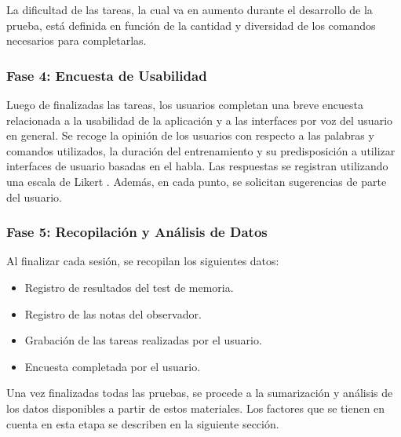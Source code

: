 La dificultad de las tareas, la cual va en aumento durante el desarrollo de la prueba, est\'a definida en funci\'on
de la cantidad y diversidad de los comandos necesarios para completarlas.

\subsubsection{Fase 4: Encuesta de Usabilidad}
Luego de finalizadas las tareas, los usuarios completan una breve encuesta relacionada a la usabilidad de
la aplicaci\'on y a las interfaces por voz del usuario en general.
Se recoge la opini\'on de los usuarios con respecto a las palabras y comandos utilizados, la duraci\'on del
entrenamiento y su predisposici\'on a utilizar interfaces de usuario basadas en el habla. Las respuestas se
registran utilizando una escala de Likert \cite{Allen:2007}.
Adem\'as, en cada punto, se solicitan sugerencias de parte del usuario. 	

\subsubsection{Fase 5: Recopilaci\'on y An\'alisis de Datos} 
Al finalizar cada sesi\'on, se recopilan los siguientes datos:
	\begin{itemize}			
		\item Registro de resultados del test de memoria.
		\item Registro de las notas del observador.
		\item Grabaci\'on de las tareas realizadas por el usuario.
		\item Encuesta completada por el usuario.
	\end{itemize}

Una vez finalizadas todas las pruebas, se procede a la sumarizaci\'on y an\'alisis de los datos disponibles
a partir de estos materiales. Los factores que se tienen en cuenta en esta etapa se describen en la
siguiente secci\'on.


